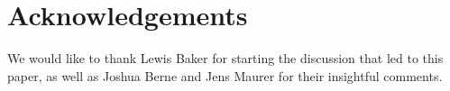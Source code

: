 

\section*{Acknowledgements}
We would like to thank Lewis Baker for starting the discussion that led to this paper, as well as Joshua Berne and Jens Maurer for their insightful comments.

\renewcommand{\bibname}{References}





